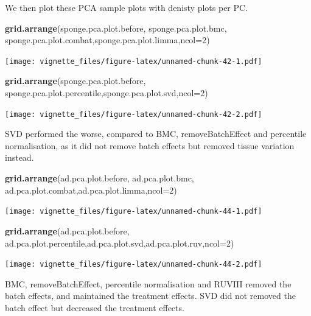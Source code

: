 \documentclass[]{book}
\newenvironment{Shaded}{\begin{snugshade}}{\end{snugshade}}
\newcommand{\KeywordTok}[1]{\textcolor[rgb]{0.13,0.29,0.53}{\textbf{#1}}}
\newcommand{\DataTypeTok}[1]{\textcolor[rgb]{0.13,0.29,0.53}{#1}}
\newcommand{\DecValTok}[1]{\textcolor[rgb]{0.00,0.00,0.81}{#1}}
\newcommand{\NormalTok}[1]{#1}
\begin{document}
We then plot these PCA sample plots with denisty plots per PC.

\begin{Shaded}
\begin{Highlighting}[]
\KeywordTok{grid.arrange}\NormalTok{(sponge.pca.plot.before, sponge.pca.plot.bmc, sponge.pca.plot.combat,sponge.pca.plot.limma,}\DataTypeTok{ncol=}\DecValTok{2}\NormalTok{)}
\end{Highlighting}
\end{Shaded}

\texttt{[image: vignette\_files/figure-latex/unnamed-chunk-42-1.pdf]}

\begin{Shaded}
\begin{Highlighting}[]
\KeywordTok{grid.arrange}\NormalTok{(sponge.pca.plot.before, sponge.pca.plot.percentile,sponge.pca.plot.svd,}\DataTypeTok{ncol=}\DecValTok{2}\NormalTok{)}
\end{Highlighting}
\end{Shaded}

\texttt{[image: vignette\_files/figure-latex/unnamed-chunk-42-2.pdf]}

SVD performed the worse, compared to BMC, removeBatchEffect and
percentile normalisation, as it did not remove batch effects but removed
tissue variation instead.

\begin{Shaded}
\begin{Highlighting}[]
\KeywordTok{grid.arrange}\NormalTok{(ad.pca.plot.before, ad.pca.plot.bmc, ad.pca.plot.combat,ad.pca.plot.limma,}\DataTypeTok{ncol=}\DecValTok{2}\NormalTok{)}
\end{Highlighting}
\end{Shaded}

\texttt{[image: vignette\_files/figure-latex/unnamed-chunk-44-1.pdf]}

\begin{Shaded}
\begin{Highlighting}[]
\KeywordTok{grid.arrange}\NormalTok{(ad.pca.plot.before, ad.pca.plot.percentile,ad.pca.plot.svd,ad.pca.plot.ruv,}\DataTypeTok{ncol=}\DecValTok{2}\NormalTok{)}
\end{Highlighting}
\end{Shaded}

\texttt{[image: vignette\_files/figure-latex/unnamed-chunk-44-2.pdf]}

BMC, removeBatchEffect, percentile normalisation and RUVIII removed the
batch effects, and maintained the treatment effects. SVD did not removed
the batch effect but decreased the treatment effects.
\end{document}
